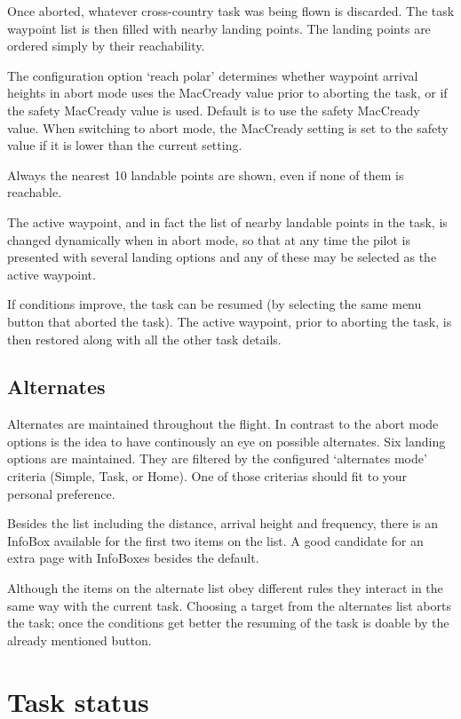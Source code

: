 Once aborted, whatever cross-country task was being flown is
discarded.  The task waypoint list is then filled with nearby landing
points. The landing points are ordered simply by their reachability.

The configuration option `reach polar' determines whether
waypoint arrival heights in abort mode uses the MacCready value prior
to aborting the task, or if the safety MacCready value is used. 
Default is to use the safety MacCready value.  When switching to
abort mode, the MacCready setting is set to the safety value 
if it is lower than the current setting.

Always the nearest 10 landable points are shown, even if none 
of them is reachable.

The active waypoint, and in fact the list of nearby landable points in
the task, is changed dynamically when in abort mode, so that at any
time the pilot is presented with several landing options and any of
these may be selected as the active waypoint.

If conditions improve, the task can be resumed (by selecting the same
menu button that aborted the task).  The active waypoint, prior to
aborting the task, is then restored along with all the other task
details.

\subsection*{Alternates} \label{sec:alternates}
Alternates are maintained throughout the flight. In contrast to the abort mode 
options is the idea to have continously an eye on possible alternates. Six landing 
options are maintained. They are filtered by the configured `alternates mode' 
criteria (Simple, Task, or Home).  
One of those criterias should fit to your personal preference. 

Besides the list including the distance, arrival height and frequency, there 
is an InfoBox available for the first two items on the list. A good candidate 
for an extra page with InfoBoxes besides the default.

Although the items on the alternate list obey different rules they interact 
in the same way 
with the current task. Choosing a target from the alternates list aborts the task; 
once the conditions get better the resuming of the task is doable by the already 
mentioned button.


\section{Task status}\label{sec:task-status}

